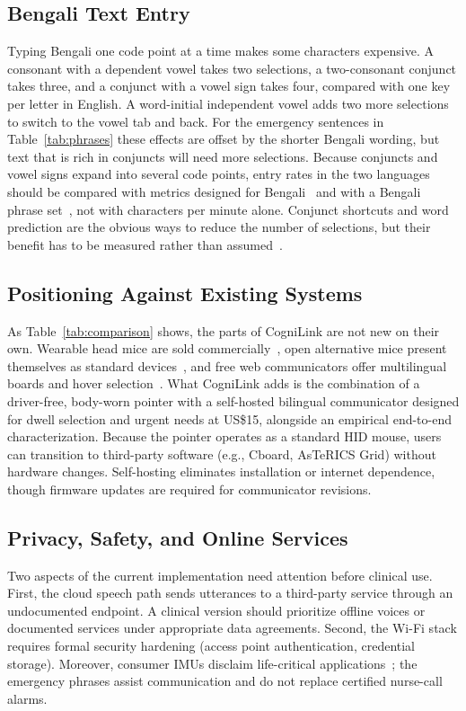 \documentclass[journal]{IEEEtran}
\begin{document}
\subsection{Bengali Text Entry}
\label{sec:disc_bengali}
Typing Bengali one code point at a time makes some characters expensive. A consonant with a dependent vowel takes two selections, a two-consonant conjunct takes three, and a conjunct with a vowel sign takes four, compared with one key per letter in English. A word-initial independent vowel adds two more selections to switch to the vowel tab and back. For the emergency sentences in Table~\ref{tab:phrases} these effects are offset by the shorter Bengali wording, but text that is rich in conjuncts will need more selections. Because conjuncts and vowel signs expand into several code points, entry rates in the two languages should be compared with metrics designed for Bengali~\cite{sarcar2015} and with a Bengali phrase set~\cite{arif2016}, not with characters per minute alone. Conjunct shortcuts and word prediction are the obvious ways to reduce the number of selections, but their benefit has to be measured rather than assumed~\cite{koester1996}.

\subsection{Positioning Against Existing Systems}
As Table~\ref{tab:comparison} shows, the parts of CogniLink are not new on their own. Wearable head mice are sold commercially~\cite{montechquha,glassouse}, open alternative mice present themselves as standard devices~\cite{flipmouse}, and free web communicators offer multilingual boards and hover selection~\cite{cboard,astericsgrid}. What CogniLink adds is the combination of a driver-free, body-worn pointer with a self-hosted bilingual communicator designed for dwell selection and urgent needs at US\$15, alongside an empirical end-to-end characterization. Because the pointer operates as a standard HID mouse, users can transition to third-party software (e.g., Cboard, AsTeRICS Grid) without hardware changes. Self-hosting eliminates installation or internet dependence, though firmware updates are required for communicator revisions.

\subsection{Privacy, Safety, and Online Services}
\label{sec:privacy}
Two aspects of the current implementation need attention before clinical use. First, the cloud speech path sends utterances to a third-party service through an undocumented endpoint. A clinical version should prioritize offline voices or documented services under appropriate data agreements. Second, the Wi-Fi stack requires formal security hardening (access point authentication, credential storage). Moreover, consumer IMUs disclaim life-critical applications~\cite{mpu6886}; the emergency phrases assist communication and do not replace certified nurse-call alarms.
\end{document}
